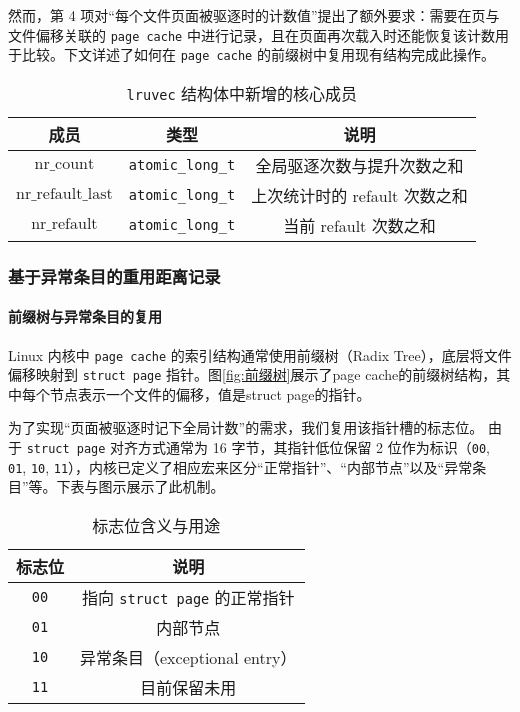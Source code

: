 然而，第 4 项对“每个文件页面被驱逐时的计数值”提出了额外要求：需要在页与文件偏移关联的 \texttt{page cache} 中进行记录，且在页面再次载入时还能恢复该计数用于比较。下文详述了如何在 \texttt{page cache} 的前缀树中复用现有结构完成此操作。

\begin{table}[htbp]
  \centering
  \caption{\texttt{lruvec} 结构体中新增的核心成员}
  \label{tab:lruvec_struct}
  \begin{tabular}{ccc}
    \toprule
    \textbf{成员} & \textbf{类型} & \textbf{说明} \\
    \midrule
    \(\mathrm{nr\_count}\) & \texttt{atomic\_long\_t} & 全局驱逐次数与提升次数之和 \\
    \midrule
    \(\mathrm{nr\_refault\_last}\) & \texttt{atomic\_long\_t} & 上次统计时的 refault 次数之和 \\
    \midrule
    \(\mathrm{nr\_refault}\) & \texttt{atomic\_long\_t} & 当前 refault 次数之和 \\
    \bottomrule
  \end{tabular}
\end{table}

\subsubsection{基于异常条目的重用距离记录}

\paragraph{前缀树与异常条目的复用}

Linux 内核中 \texttt{page cache} 的索引结构通常使用前缀树（Radix Tree），底层将文件偏移映射到 \texttt{struct page} 指针。图\ref{fig:前缀树}展示了page cache的前缀树结构，其中每个节点表示一个文件的偏移，值是struct page的指针。

为了实现“页面被驱逐时记下全局计数”的需求，我们复用该指针槽的标志位。  
由于 \texttt{struct page} 对齐方式通常为 16 字节，其指针低位保留 2 位作为标识（\texttt{00}, \texttt{01}, \texttt{10}, \texttt{11}），内核已定义了相应宏来区分“正常指针”、“内部节点”以及“异常条目”等。下表与图示展示了此机制。

\begin{table}[htbp]
  \centering
  \caption{标志位含义与用途}
  \label{tab:标志位}
  \begin{tabular}{cc}
    \toprule
    \textbf{标志位} & \textbf{说明} \\
    \midrule
    \texttt{00} & 指向 \texttt{struct page} 的正常指针 \\
    \texttt{01} & 内部节点 \\
    \texttt{10} & 异常条目（exceptional entry） \\
    \texttt{11} & 目前保留未用 \\
    \bottomrule
  \end{tabular}
\end{table}

